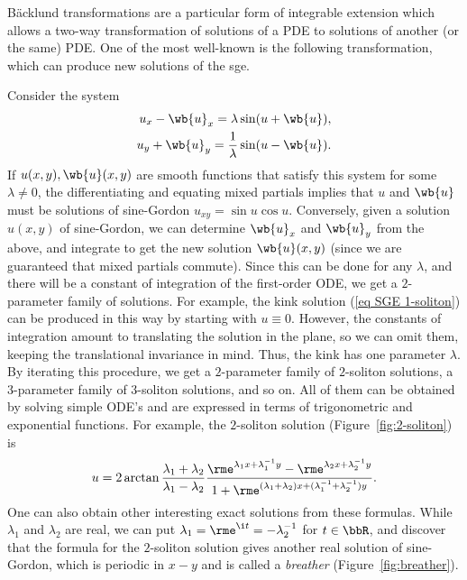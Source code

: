 B\"acklund transformations are a particular form of integrable extension which allows a two-way transformation of solutions of a PDE to solutions of another (or the same) PDE. One of the most well-known is the following transformation, which can produce new solutions of the \gls{sge}.

\begin{example}\label{ex 7.5.9 Ivey}
    Consider the system
    \begin{align}
        u_x-\wb{u}_x=\lambda&\sin(u+\wb{u}),\\
        u_y+\wb{u}_y=\frac{1}{\lambda}&\sin(u-\wb{u}).
    \end{align}
    If $u(x,y),\wb{u}(x,y)$ are smooth functions that satisfy this system for some $\lambda\neq 0$, the differentiating and equating mixed partials implies that $u$ and $\wb{u}$ must be solutions of sine-Gordon $u_{xy}=\sin u\cos u$. Conversely, given a solution $u(x,y)$ of sine-Gordon, we can determine $\wb{u}_x$ and $\wb{u}_y$ from the above, and integrate to get the new solution $\wb{u}(x,y)$ (since we are guaranteed that mixed partials commute). Since this can be done for any $\lambda$, and there will be a constant of integration of the first-order ODE, we get a $2$-parameter family of solutions. For example, the kink solution (\ref{eq SGE 1-soliton}) can be produced in this way by starting with $u\equiv 0$. However, the constants of integration amount to translating the solution in the plane, so we can omit them, keeping the translational invariance in mind. Thus, the kink has one parameter $\lambda$. By iterating this procedure, we get a $2$-parameter family of $2$-soliton solutions, a $3$-parameter family of $3$-soliton solutions, and so on. All of them can be obtained by solving simple ODE's and are expressed in terms of trigonometric and exponential functions. For example, the $2$-soliton solution (Figure~\ref{fig:2-soliton}) is 
    \[u=2\arctan \frac{\lambda_1+\lambda_2}{\lambda_1-\lambda_2}\frac{\rme^{\lambda_1x+\lambda_1^{-1}y}-\rme^{\lambda_2 x+\lambda_2^{-1}y}}{1+\rme^{(\lambda_1+\lambda_2)x+(\lambda_1^{-1}+\lambda_2^{-1})y}}.\label{eq sge 2-soliton}\]
    One can also obtain other interesting exact solutions from these formulas. While $\lambda_1$ and $\lambda_2$ are real, we can put $\lambda_1=\rme^{\i t}=-\lambda_2^{-1}$ for $t\in \bbR$, and discover that the formula for the $2$-soliton solution gives another real solution of sine-Gordon, which is periodic in $x-y$ and is called a \emph{breather} (Figure~\ref{fig:breather}).
\end{example}

